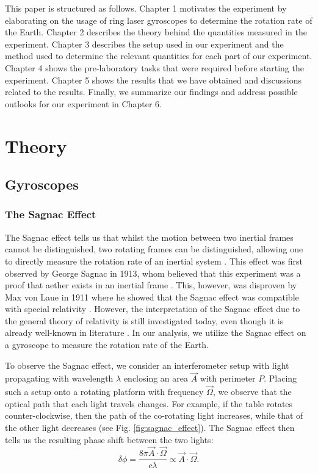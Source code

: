 \documentclass[a4paper]{report}
\numberwithin{equation}{section}
\begin{document}
This paper is structured as follows. Chapter 1 motivates the experiment by elaborating on the usage of ring laser gyroscopes
to determine the rotation rate of the Earth. Chapter 2 describes the theory behind the quantities measured in the experiment. Chapter 3
describes the setup used in our experiment and the method used to determine the relevant quantities for each part of our experiment. 
Chapter 4 shows the pre-laboratory tasks that were required before starting the experiment. Chapter 5 shows the results
that we have obtained and discussions related to the results. Finally, we summarize our findings and address possible outlooks for our experiment
in Chapter 6. 



\chapter{Theory}

\section{Gyroscopes}

\subsection{The Sagnac Effect}

The Sagnac effect tells us that whilst the motion between two inertial frames cannot be distinguished, two rotating frames can be 
distinguished, allowing one to directly measure the rotation rate of an inertial system \cite{Groh2021}. This effect was first observed by 
George Sagnac in 1913, whom believed that this experiment was a proof that aether exists in an inertial frame  \cite{Darrigol2014}. This, however, was 
disproven by Max von Laue in 1911 where he showed that the Sagnac effect was compatible with special relativity \cite{Laue1911}. 
However, the interpretation of the Sagnac effect due to the general theory of relativity is still investigated today, 
even though it is already well-known in literature \cite{Benedetto2019}. In our analysis, we utilize the Sagnac effect on a gyroscope to 
measure the rotation rate of the Earth.\par

To observe the Sagnac effect, we consider an interferometer setup with light propagating with wavelength $\lambda$ enclosing an area $\vec{A}$
 with perimeter $P$. Placing such a setup onto a rotating platform with frequency $\vec{\Omega}$, we observe that the optical path that
 each light travels changes. For example, if the table rotates counter-clockwise, then the path of the co-rotating light increases, while that of the other light
decreases (see Fig. \ref{fig:sagnac_effect}). The Sagnac effect then tells us the resulting phase shift between the two lights:
\begin{equation}
	\delta \phi = \frac{8\pi \vec{A} \cdot \vec{\Omega}}{c \lambda} \propto \vec{A} \cdot \vec{\Omega}.
\end{equation} 
\end{document}
